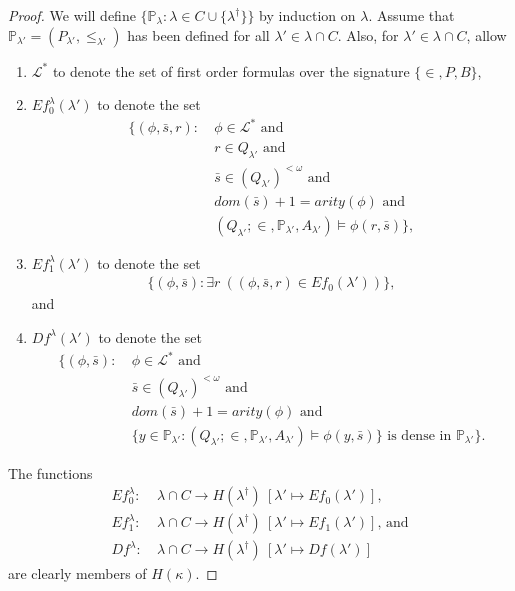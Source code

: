\documentclass[12pt, twoside]{memoir}
\numberwithin{equation}{section}
\theoremstyle{definition}
\theoremstyle{remark}
\theoremstyle{definition}
\theoremstyle{definition}
\theoremstyle{definition}
\theoremstyle{remark}
\begin{document}
\begin{proof}
We will define $\{\mathbb{P}_{\lambda} : \lambda \in C \cup \{\lambda^{\dagger}\}\}$ by induction on $\lambda$. Assume that $\mathbb{P}_{\lambda'} = (P_{\lambda'}, \leq_{\lambda'})$ has been defined for all $\lambda' \in \lambda \cap C$. Also, for $\lambda' \in \lambda \cap C$, allow 
\begin{enumerate}[label=(\Alph*)]
    \item $\mathcal{L^*}$ to denote the set of first order formulas over the signature $\{\in, P, B\}$,
    \item $Ef_0^{\lambda}(\lambda')$ to denote the set 
    \begin{align*}
        \{(\phi, \bar{s}, r) : \ & \phi \in \mathcal{L}^* \text{ and} \\
        & r \in Q_{\lambda'} \text{ and} \\
        & \bar{s} \in (Q_{\lambda'})^{< \omega} \text{ and} \\
        & dom(\bar{s}) + 1 = arity(\phi) \text{ and} \\
        & (Q_{\lambda'}; \in, \mathbb{P}_{\lambda'}, A_{\lambda'}) \models \phi(r, \bar{s})\},
    \end{align*}
    \item $Ef_1^{\lambda}(\lambda')$ to denote the set
    \begin{align*}
        \{(\phi, \bar{s}) : \exists r \ ((\phi, \bar{s}, r) \in Ef_0(\lambda'))\},
    \end{align*}
    and
    \item $Df^{\lambda}(\lambda')$ to denote the set 
    \begin{align*}
        \{(\phi, \bar{s}) : \ & \phi \in \mathcal{L}^* \text{ and} \\
        & \bar{s} \in (Q_{\lambda'})^{< \omega} \text{ and} \\
        & dom(\bar{s}) + 1 = arity(\phi) \text{ and} \\
        & \{y \in \mathbb{P}_{\lambda'} : (Q_{\lambda'}; \in, \mathbb{P}_{\lambda'}, A_{\lambda'}) \models \phi(y, \bar{s})\} \text{ is dense in } \mathbb{P}_{\lambda'}\}.
    \end{align*}
\end{enumerate}
The functions 
\begin{align*}
    Ef_0^{\lambda} : \ & \lambda \cap C \longrightarrow H(\lambda^{\dagger}) \ [\lambda' \mapsto Ef_0(\lambda')] \text{,} \\
    Ef_1^{\lambda} : \ & \lambda \cap C \longrightarrow H(\lambda^{\dagger}) \ [\lambda' \mapsto Ef_1(\lambda')] \text{, and}  \\
    Df^{\lambda} : \ & \lambda \cap C \longrightarrow H(\lambda^{\dagger}) \ [\lambda' \mapsto Df(\lambda')]
\end{align*}
are clearly members of $H(\kappa)$.


\end{proof}
\end{document}
